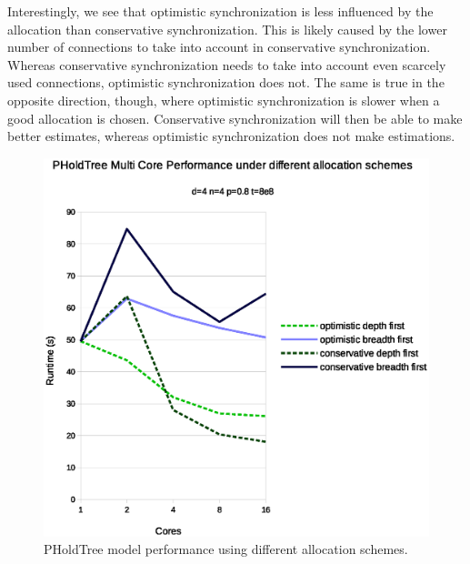 Interestingly, we see that optimistic synchronization is less influenced by the allocation than conservative synchronization.
This is likely caused by the lower number of connections to take into account in conservative synchronization.
Whereas conservative synchronization needs to take into account even scarcely used connections, optimistic synchronization does not.
The same is true in the opposite direction, though, where optimistic synchronization is slower when a good allocation is chosen.
Conservative synchronization will then be able to make better estimates, whereas optimistic synchronization does not make estimations. 

\begin{figure}
    \center
    \includegraphics[width=\columnwidth]{fig/pholdtreeallochighp.eps}
    \caption{PHoldTree model performance using different allocation schemes.}
    \label{fig:PholdTree_plot_alloc_high}
\end{figure}
